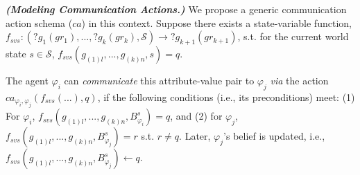 \documentclass[letterpaper]{article} %
\begin{document}
\noindent \textit{\textbf{(Modeling Communication Actions.)}} 
% 
We propose a generic communication action schema ($ca$) in this context. 
Suppose there exists a state-variable function,  $f_{svs}:(?g_1 (gr_1),..., ?g_k (gr_k),\mathcal{S}) \rightarrow ?g_{k+1} (gr_{k+1})$, s.t. for the current world state $s \in \mathcal{S}$, 
$f_{\textit{svs}}(g_{(1)l},...,g_{(k)n},s) = q$.

The agent $\varphi_i$ can \textit{communicate} 
this attribute-value pair to $\varphi_j$ \textit{via} the action $ca_{\varphi_i, \varphi_j}(f_{\textit{svs}}(...),q)$, if the following conditions (i.e., its preconditions) meet: 
(1) For $\varphi_i$, 
$f_{\textit{svs}}(g_{(1)l},...,g_{(k)n},B_{\varphi_i}^s) = q$, and (2) for $\varphi_j$,
$f_{\textit{svs}}(g_{(1)l},...,g_{(k)n},B_{\varphi_j}^s) = r$ s.t.
$r \neq q$.
Later, $\varphi_j$'s belief is updated, i.e., $f_{\textit{svs}}(g_{(1)l},...,g_{(k)n},B_{\varphi_j}^s) \leftarrow q$. 



\end{document}
